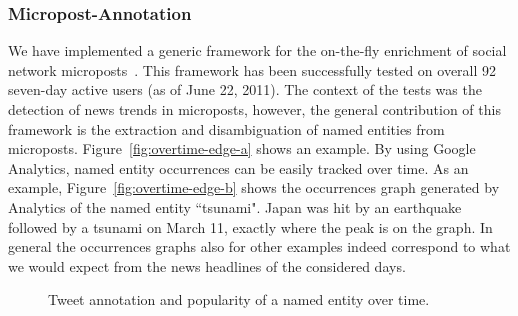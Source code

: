 \documentclass[runningheads,a4paper]{llncs}
\begin{document}
\subsubsection{Micropost-Annotation}
We have implemented a generic framework for the on-the-fly enrichment of social network microposts~\cite{twittertrends}. This framework has been successfully tested on overall 92 seven-day active users (as of June 22, 2011). The context of the tests was the detection of news trends in microposts, however, the general contribution of this framework is the extraction and disambiguation of named entities from microposts. Figure~\ref{fig:overtime-edge-a} shows an example. By using Google Analytics, named entity occurrences can be easily tracked over time. As an example, Figure~\ref{fig:overtime-edge-b} shows the occurrences graph generated by Analytics of the named entity ``tsunami". Japan was hit by an earthquake followed by a tsunami on March 11, exactly where the peak is on the graph. In general the occurrences graphs also for other examples indeed correspond to what we would expect from the news headlines of the considered days.

\begin{figure}[htb!]
  \begin{center}
\hspace{5pt}
  \caption{Tweet annotation and popularity of a named entity over time.}
  \label{fig:overtime}
  \end{center}  
\end{figure}
\end{document}

